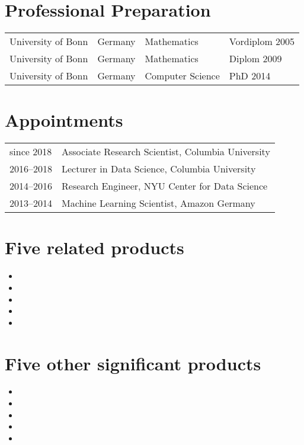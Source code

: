 \documentclass[11pt,letterpaper]{article}
\newcounter{required}
\begin{document}


\section*{Professional Preparation}
\begin{tabular}{l l l l}
University of Bonn& Germany& Mathematics     &  Vordiplom 2005\\
University of Bonn& Germany& Mathematics     &  Diplom 2009\\
University of Bonn& Germany& Computer Science&  PhD 2014\\
\end{tabular}

\section*{Appointments}
\begin{tabular}{l l}
since 2018& Associate Research Scientist, Columbia University\\
2016--2018& Lecturer in Data Science, Columbia University\\
2014--2016& Research Engineer, NYU Center for Data Science\\
2013--2014& Machine Learning Scientist, Amazon Germany\\
\end{tabular}

\section*{Five related products}
\begin{itemize}
    \item {}
    \item {}  %
    \item {}            %
    \item {} %
    \item {}             
\end{itemize}
\pagebreak
\section*{Five other significant products}
\begin{itemize}
    \item {}
    \item {}
    \item {}
    \item {}
    \item {}
\end{itemize}
\end{document}
